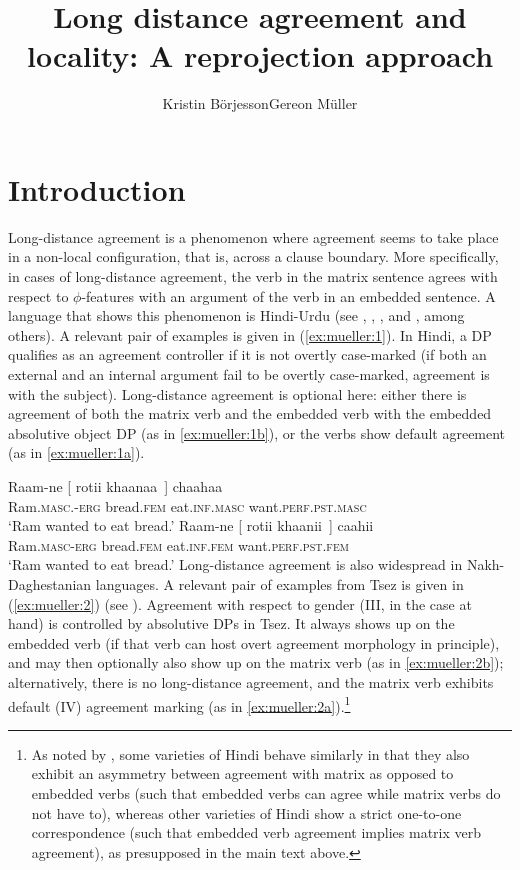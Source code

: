 \documentclass[output=paper
,modfonts
,nonflat]{langsci/langscibook}
\title{Long distance agreement and locality:\newlineCover{} A reprojection approach}
\author{Kristin Börjesson\affiliation{Universität Leipzig}\lastand Gereon Müller\affiliation{Universität Leipzig}}
\begin{document}
	
	\maketitle
	
	\newcommand{\refprefix}{ex:mueller:}
	\section{Introduction} \label{sec-bjoe-muel:1}
	
	Long-distance agreement is a phenomenon where agreement seems to take
	place in a non-local configuration, that is, across a clause boundary.
	More specifically, in cases of long-distance agreement, the verb in
	the matrix sentence agrees with respect to $\phi$-features with an
	argument of the verb in an embedded sentence. A language that shows
	this phenomenon is Hindi-Urdu (see \citealt{Mahajan:90},
	\citealt{Butt:95,Butt:08}, \citealt{Bhatt:05}, and \citealt{Chandra:05}, among
	others). A relevant pair of examples is given in (\ref{ex:mueller:1}). In Hindi, a DP
	qualifies as an agreement controller if it is not overtly case-marked (if
	both an external and an internal argument fail to be overtly
	case-marked, agreement is with the subject). Long-distance agreement
	is optional here: either there is agreement of both the matrix verb
	and the embedded verb with the embedded absolutive object DP (as in
	\ref{ex:mueller:1b}), or the verbs show default agreement (as in \ref{ex:mueller:1a}).
	
	\ea\label{ex:mueller:1}
	\ea \label{ex:mueller:1a}
	\gll  Raam-ne [\sub{$\alpha$} rotii khaanaa~] chaahaa \\ 
	Ram.{\scshape masc}.-{\scshape erg} {} bread.{\scshape fem} eat.{\scshape inf}.{\scshape masc} want.{\scshape perf.pst.masc} \\ 
	\glt  `Ram wanted to eat bread.'
	\ex \label{ex:mueller:1b}
	\gll Raam-ne [\sub{$\alpha$} rotii khaanii~] caahii \\ 
	Ram.{\scshape masc}-{\scshape erg} {} bread.{\scshape fem} eat.{\scshape inf}.{\scshape fem} want.{\scshape perf.pst.fem} \\ 
	\glt `Ram wanted to eat bread.'
	\z
	\z
	Long-distance agreement is also widespread in Nakh-Daghestanian
	languages. A relevant pair of examples from Tsez is given in (\ref{ex:mueller:2})
	(see \citealt{PolinskyPotsdam:01}). Agreement with respect to gender
	(III, in the case at hand) is controlled by
	absolutive DPs in Tsez. It always shows up on the embedded verb (if
	that verb can host overt agreement morphology in principle), and may
	then optionally also show up on the matrix verb (as in \ref{ex:mueller:2b});
	alternatively, there is no long-distance agreement, and the matrix
	verb exhibits default (IV) agreement marking (as in \ref{ex:mueller:2a}).\footnote{As
		noted by \citet{Bhatt:05}, some varieties of Hindi behave similarly
		in that they also exhibit an asymmetry between agreement with matrix
		as opposed to embedded verbs (such that embedded verbs can agree
		while matrix verbs do not have to), whereas other varieties of Hindi show a
		strict one-to-one correspondence (such that embedded verb agreement
		implies matrix verb agreement), as presupposed in the main text above.}
\end{document}
